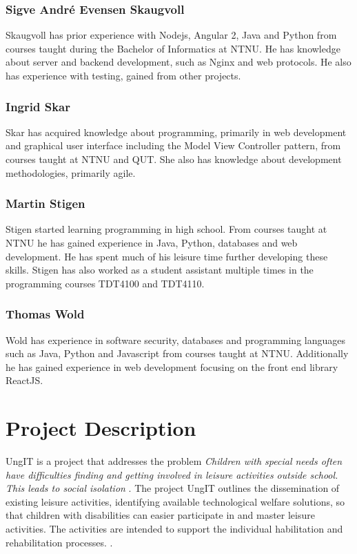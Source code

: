 \subsubsection{Sigve André Evensen Skaugvoll}
\label{sigve}
Skaugvoll has prior experience with Nodejs, Angular 2, Java and Python from courses taught during the Bachelor of Informatics at NTNU. He has knowledge about server and backend development, such as Nginx and web protocols. He also has experience with testing, gained from other projects.

\subsubsection{Ingrid Skar}
Skar has acquired knowledge about programming, primarily in web development and graphical user interface including the Model View Controller pattern, from courses taught at NTNU and QUT. She also has knowledge about development methodologies, primarily agile. 

\subsubsection{Martin Stigen}
Stigen started learning programming in high school. From courses taught at NTNU he has gained experience in Java, Python, databases and web development. He has spent much of his leisure time further developing these skills. Stigen has also worked as a student assistant multiple times in the programming courses TDT4100 and TDT4110.

\subsubsection{Thomas Wold}
Wold has experience in software security, databases and programming languages such as Java, Python and Javascript from courses taught at NTNU. Additionally he has gained experience in web development focusing on the front end library ReactJS. 

\section{Project Description}
\label{project_description}
UngIT is a project that addresses the problem \textit{Children with special needs often have difficulties finding and getting involved in leisure activities outside school. This leads to social isolation} \cite{SintefBachelorProjectDescription}. The project UngIT outlines the dissemination of existing leisure activities, identifying available technological welfare solutions, so that children with disabilities can easier participate in and master leisure activities. The activities are intended to support the individual habilitation and rehabilitation processes. \cite{SintefOnlineProjectDescription}.

